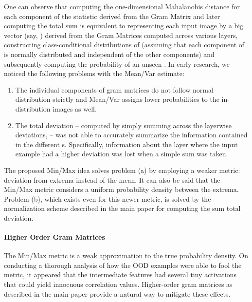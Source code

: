 \documentclass{article}
\begin{document}
\begin{enumerate}
    One can observe that computing the one-dimensional Mahalanobis distance for each component of the statistic derived from the Gram Matrix and later computing the total sum is equivalent to representing each input image by a big vector (say, ) derived from the Gram Matrices computed across various layers, constructing class-conditional distributions of  (assuming that each component of  is normally distributed and independent of the other components) and subsequently computing the probability of an unseen . In early research, we noticed the following problems with the Mean/Var estimate:
    \begin{enumerate}
        \item The individual components of gram matrices do not follow normal distribution strictly and Mean/Var assigns lower probabilities to the in-distribution images as well.
        \item The total deviation  -- computed by simply summing across the layerwise deviations,  -- was not able to accurately summarize the information contained in the different s. Specifically, information about the layer where the input example had a higher deviation was lost when a simple sum was taken.
    \end{enumerate}
    The proposed Min/Max idea solves problem (a) by employing a weaker metric: deviation from extrema instead of the mean. It can also be said that the Min/Max metric considers a uniform probability density between the extrema. Problem (b), which exists even for this newer metric, is solved by the normalization scheme described in the main paper for computing the sum total deviation.
\end{enumerate}

\paragraph{Higher Order Gram Matrices} The Min/Max metric is a weak approximation to the true probability density. On conducting a thorough analysis of how the OOD examples were able to fool the metric, it appeared that the intermediate features had several tiny activations that could yield innocuous correlation values. Higher-order gram matrices as described in the main paper provide a natural way to mitigate these effects.
\end{document}
